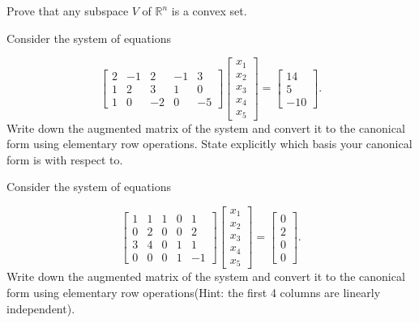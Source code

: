 \documentclass[12pt]{extarticle}
\theoremstyle{definition}
\def\R{{\mathbb{R}}}
\begin{document}
\begin{problem} Prove that any subspace $V$ of $\R^n$ is a convex set.

\end{problem}

\begin{problem} Consider the system of equations 

	\[\begin{bmatrix}
	2&-1&2&-1&3\\1&2&3&1&0\\1&0&-2&0&-5
	\end{bmatrix}\begin{bmatrix}
	x_1\\x_2\\x_3\\x_4\\x_5
	\end{bmatrix}=\begin{bmatrix}
	14\\5\\-10
	\end{bmatrix}.\]
	Write down the augmented matrix of the system and convert it to the canonical form using elementary row operations. State explicitly which basis your canonical form is with respect to.

\end{problem}

\begin{problem} Consider the system of equations 

	\[\begin{bmatrix}
	1&1&1&0&1\\
	0&2&0&0&2\\
	3&4&0&1&1\\
	0&0&0&1&-1
	\end{bmatrix}\begin{bmatrix}
	x_1\\x_2\\x_3\\x_4\\x_5
	\end{bmatrix}=\begin{bmatrix}
	0\\2\\0\\0
	\end{bmatrix}.\]
	Write down the augmented matrix of the system and convert it to the canonical form using elementary row operations(Hint: the first 4 columns are linearly independent). 

\end{problem}


\small


\end{document}
